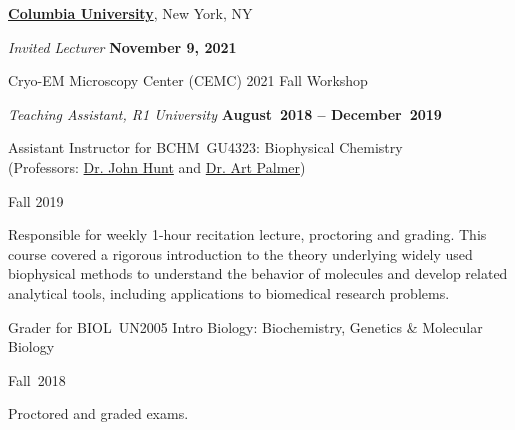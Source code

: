 \documentclass[10pt]{article}
\newcommand{\halfblankline}{\quad\vspace{-0.5\baselineskip}\pagebreak[3]}
\begin{document}
	\halfblankline
	
	
	\href{http://www.columbia.edu/}{\textbf{Columbia University}},
	New York, NY
	\begin{outerlist}
	
		\item[] \textit{Invited Lecturer}%
		\hfill \textbf{November 9, 2021}
		\begin{innerlist}
			\item Cryo-EM Microscopy Center (CEMC) 2021 Fall Workshop
		\end{innerlist}
		
		\item[] \textit{Teaching Assistant, R1 University}%
		\hfill \textbf{August~2018 -- December~2019}
		\begin{innerlist}
			\item Assistant Instructor for BCHM~GU4323: Biophysical Chemistry\\(Professors: \href{https://www.biology.columbia.edu/people/hunt} {Dr. John Hunt} and \href{https://www.biochem.cuimc.columbia.edu/research-labs/palmer-lab} {Dr. Art Palmer})
			\begin{innerlist}
				\item Fall 2019
				\item Responsible for weekly 1-hour recitation lecture, proctoring and grading. This course covered a rigorous introduction to the theory underlying widely used biophysical methods to understand the behavior of molecules and develop related analytical tools, including applications to biomedical research problems.
			\end{innerlist}
			
			\halfblankline
			
			\item Grader for BIOL~UN2005 Intro Biology: Biochemistry, Genetics \& Molecular Biology
			\begin{innerlist}
				\item Fall~2018
				\item Proctored and graded exams.
			\end{innerlist}
			
			\halfblankline
			
		\end{innerlist}
	\end{outerlist}
\end{document}
